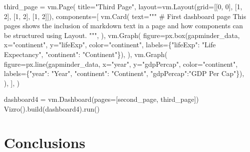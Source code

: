 \documentclass[
  letterpaper,
  DIV=11,
  numbers=noendperiod]{scrreprt}
\newenvironment{Shaded}{\begin{snugshade}}{\end{snugshade}}
\newcommand{\DecValTok}[1]{\textcolor[rgb]{0.68,0.00,0.00}{#1}}
\newcommand{\NormalTok}[1]{\textcolor[rgb]{0.00,0.23,0.31}{#1}}
\newcommand{\OperatorTok}[1]{\textcolor[rgb]{0.37,0.37,0.37}{#1}}
\newcommand{\StringTok}[1]{\textcolor[rgb]{0.13,0.47,0.30}{#1}}
\begin{document}
\begin{Shaded}
\begin{Highlighting}[]
\NormalTok{third\_page }\OperatorTok{=}\NormalTok{ vm.Page(}
\NormalTok{    title}\OperatorTok{=}\StringTok{"Third Page"}\NormalTok{,}
\NormalTok{    layout}\OperatorTok{=}\NormalTok{vm.Layout(grid}\OperatorTok{=}\NormalTok{[[}\DecValTok{0}\NormalTok{, }\DecValTok{0}\NormalTok{], [}\DecValTok{1}\NormalTok{, }\DecValTok{2}\NormalTok{], [}\DecValTok{1}\NormalTok{, }\DecValTok{2}\NormalTok{], [}\DecValTok{1}\NormalTok{, }\DecValTok{2}\NormalTok{]]),}
\NormalTok{    components}\OperatorTok{=}\NormalTok{[}
\NormalTok{        vm.Card(}
\NormalTok{            text}\OperatorTok{=}\StringTok{"""}
\StringTok{                \# First dashboard page}
\StringTok{                This pages shows the inclusion of markdown text in a page and how components}
\StringTok{                can be structured using Layout.}
\StringTok{            """}\NormalTok{,}
\NormalTok{        ),}
\NormalTok{        vm.Graph(}
\NormalTok{            figure}\OperatorTok{=}\NormalTok{px.box(gapminder\_data, x}\OperatorTok{=}\StringTok{"continent"}\NormalTok{, y}\OperatorTok{=}\StringTok{"lifeExp"}\NormalTok{, color}\OperatorTok{=}\StringTok{"continent"}\NormalTok{,}
\NormalTok{                            labels}\OperatorTok{=}\NormalTok{\{}\StringTok{"lifeExp"}\NormalTok{: }\StringTok{"Life Expectancy"}\NormalTok{, }\StringTok{"continent"}\NormalTok{: }\StringTok{"Continent"}\NormalTok{\}),}
\NormalTok{        ),}
\NormalTok{        vm.Graph(}
\NormalTok{            figure}\OperatorTok{=}\NormalTok{px.line(gapminder\_data, x}\OperatorTok{=}\StringTok{"year"}\NormalTok{, y}\OperatorTok{=}\StringTok{"gdpPercap"}\NormalTok{, color}\OperatorTok{=}\StringTok{"continent"}\NormalTok{,}
\NormalTok{                            labels}\OperatorTok{=}\NormalTok{\{}\StringTok{"year"}\NormalTok{: }\StringTok{"Year"}\NormalTok{, }\StringTok{"continent"}\NormalTok{: }\StringTok{"Continent"}\NormalTok{,}
                            \StringTok{"gdpPercap"}\NormalTok{:}\StringTok{"GDP Per Cap"}\NormalTok{\}),}
\NormalTok{            ),}
\NormalTok{    ],}
\NormalTok{)}

\NormalTok{dashboard4 }\OperatorTok{=}\NormalTok{ vm.Dashboard(pages}\OperatorTok{=}\NormalTok{[second\_page, third\_page])}
\NormalTok{Vizro().build(dashboard4).run()}
\end{Highlighting}
\end{Shaded}

\section{Conclusions}\label{conclusions-1}
\end{document}
